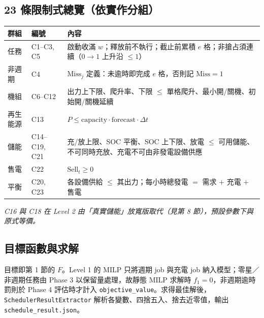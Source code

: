 \documentclass[12pt,a4paper,fontset=none]{ctexart}
\newcommand{\fn}[1]{\texttt{\small #1}}
\begin{document}
\subsection{23 條限制式總覽（依實作分組）}
\begin{center}
\begin{tabularx}{\linewidth}{llX}
\toprule
\textbf{群組} & \textbf{編號} & \textbf{內容} \\
\midrule
任務 & C1--C3, C5 & 啟動收滿 $w$；釋放前不執行；截止前累積 $e$ 格；非搶占須連續（$0\to1$ 上升沿 $\le 1$） \\
非週期 & C4 & $\mathrm{Miss}_j$ 定義：未逾時即完成 $e$ 格，否則記 $\mathrm{Miss}=1$ \\
機組 & C6--C12 & 出力上下限、爬升率、下限 $\le$ 單格爬升、最小開/關機、初始開/關機延續 \\
再生能源 & C13 & $P\le \mathrm{capacity}\cdot\mathrm{forecast}\cdot\Delta t$ \\
儲能 & C14--C19, C21 & 充/放上限、SOC 平衡、SOC 上下限、放電 $\le$ 可用儲能、不可同時充放、充電不可由非發電設備供應 \\
售電 & C22 & $\mathrm{Sell}_t\ge 0$ \\
平衡 & C20, C23 & 各設備供給 $\le$ 其出力；每小時總發電 $=$ 需求 $+$ 充電 $+$ 售電 \\
\bottomrule
\end{tabularx}
\end{center}
\noindent\textit{C16 與 C18 在 Level 2 由「真實儲能」放寬版取代（見第 8 節），預設參數下與原式等價。}

\subsection{目標函數與求解}
目標即第 1 節的 $F$。Level 1 的 MILP 只將週期 job 與充電 job 納入模型；零星／非週期任務由 Phase 3 以保留量處理，故靜態 MILP 求解時 $f_1=0$，非週期逾時罰則於 Phase 4 評估時才計入 \fn{objective\_value}。求得最佳解後，\fn{SchedulerResultExtractor} 解析各變數、四捨五入、捨去近零值，輸出 \fn{schedule\_result.json}。

\end{document}
